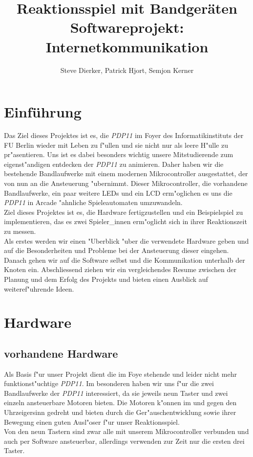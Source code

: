 \documentclass[a4paper]{article}
\title{%
  Reaktionsspiel mit Bandgeräten \\
  \large Softwareprojekt: Internetkommunikation}
\author{Steve Dierker, Patrick Hjort, Semjon Kerner}
\begin{document}
\maketitle

\section{Einführung}
  \label{sec:intro}
  Das Ziel dieses Projektes ist es, die \textit{PDP11} im Foyer des
  Informatikinstituts der FU Berlin wieder mit Leben zu f"ullen und sie nicht
  nur als leere H"ulle zu pr"asentieren. Uns ist es dabei besonders wichtig
  unsere Mitstudierende zum eigenst"andigen entdecken der \textit{PDP11} zu
  animieren.  Daher haben wir die bestehende Bandlaufwerke mit einem modernen
  Mikrocontroller ausgestattet, der von nun an die Ansteuerung "ubernimmt.
  Dieser Mikrocontroller, die vorhandene Bandlaufwerke, ein paar weitere LEDs
  und ein LCD erm"oglichen es uns die \textit{PDP11} in Arcade "ahnliche
  Spieleautomaten umzuwandeln.\\
  Ziel dieses Projektes ist es, die Hardware fertigzustellen und ein
  Beispielspiel zu implementieren, das es zwei Spieler\_innen erm"oglicht sich
  in ihrer Reaktionszeit zu messen.\\
  Als erstes werden wir einen "Uberblick "uber die verwendete Hardware geben
  und auf die Besonderheiten und Probleme bei der Ansteuerung dieser eingehen.
  Danach gehen wir auf die Software selbst und die Kommunikation unterhalb der
  Knoten ein. Abschliessend ziehen wir ein vergleichendes Resume zwischen der
  Planung und dem Erfolg des Projekts und bieten einen Ausblick auf
  weiteref"uhrende Ideen.

\section{Hardware}
  \label{sec:hardware}
  \subsection{vorhandene Hardware}
    \label{sec:hardware_existing}
    Als Basis f"ur unser Projekt dient die im Foye stehende und leider nicht
    mehr funktionst"uchtige \textit{PDP11}. Im besonderen haben wir uns f"ur
    die zwei Bandlaufwerke der \textit{PDP11} interessiert, da sie jeweils neun
    Taster und zwei einzeln ansteuerbare Motoren bieten. Die Motoren k"onnen im
    und gegen den Uhrzeigersinn gedreht und bieten durch die
    Ger"auschentwicklung sowie ihrer Bewegung einen guten Ausl"oser f"ur unser
    Reaktionsspiel.\\
    Von den neun Tastern sind zwar alle mit unserem Mikrocontroller verbunden
    und auch per Software ansteuerbar, allerdings verwenden zur Zeit nur die
    ersten drei Taster.
\end{document}
